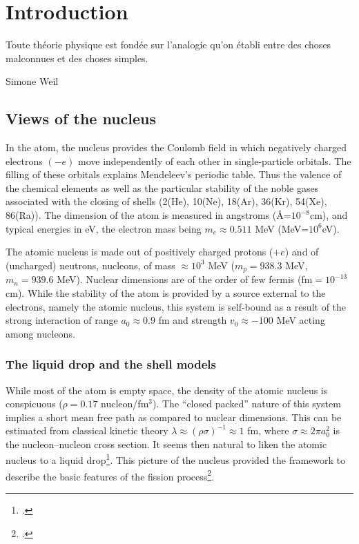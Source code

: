 	\chapter{Introduction}\label{introduction}
	 \epigraph{Toute th\'eorie physique est fond\'ee sur l'analogie qu'on \'etabli entre des choses malconnues et des choses simples.}{Simone Weil}
\section{Views of the nucleus}
In the atom, the nucleus provides the Coulomb field in which negatively charged electrons $(-e)$ move independently of each other in single-particle orbitals. The filling of these orbitals explains Mendeleev's periodic table. Thus the valence of the chemical elements as well as the particular stability of the noble gases associated with the closing of shells (2(He), 10(Ne), 18(Ar), 36(Kr), 54(Xe), 86(Ra)). The dimension of the atom is measured in angstroms (\AA=$10^{-8}$cm), and typical energies in eV, the electron mass being $m_e\approx 0.511$ MeV (MeV=$10^6$eV).


The atomic nucleus is made out of positively charged protons ($+e$) and of (uncharged) neutrons, nucleons, of mass $\approx 10^3$ MeV ($m_p=938.3$ MeV, $m_n=939.6$ MeV). Nuclear dimensions are of the order of few fermis (fm$=10^{-13}$ cm). While the stability of the atom is provided by a source external to the electrons, namely the atomic nucleus, this system is  self-bound as a result of the strong interaction of range $a_0\approx 0.9$ fm and strength $v_0\approx -100$ MeV acting among nucleons. 
\subsection{The liquid drop and the shell models}\label{S1.1.1}
While most of the atom is empty space, the density of the atomic nucleus is conspicuous ($\rho=0.17$ nucleon/fm$^3$). The ``closed packed'' nature of this system implies a short mean free path as compared to nuclear dimensions. This can be estimated from classical kinetic theory $\lambda\approx(\rho\sigma)^{-1}\approx1$ fm, where $\sigma\approx 2\pi a_0^2$ is the nucleon--nucleon cross section. It seems then natural to liken the atomic nucleus to a liquid drop\footnote{\cite{Bohr:37}.}.
This picture of the nucleus provided the framework to describe the basic features of the fission process\footnote{\cite{Meitner:39,Bohr:39}.}. 




